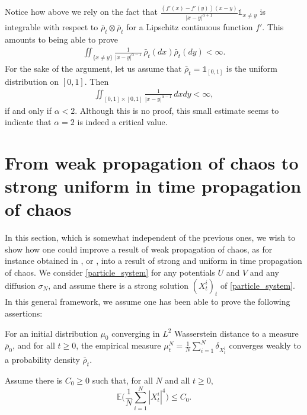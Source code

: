 \begin{remark}
Notice how above we rely on the fact that $\frac{(f'(x)-f'(y))(x-y)}{|x-y|^{\alpha+1}}\mathds{1}_{x\neq y}$ is integrable with respect to $\bar{\rho}_t\otimes\bar{\rho}_t$ for a Lipschitz continuous function $f'$. This amounts to being able to prove
\begin{align*}
\iint_{\{x\neq y\}}\frac{1}{|x-y|^{\alpha-1}}\,\bar{\rho}_t(dx)\bar{\rho}_t(dy)<\infty.
\end{align*}
For the sake of the argument, let us assume that $\bar{\rho}_t=\mathds{1}_{[0,1]}$ is the uniform distribution on $[0,1]$. Then
\begin{align*}
\iint_{[0,1]\times[0,1]}\frac{1}{|x-y|^{\alpha-1}}\,dxdy<\infty,
\end{align*}
if and only if $\alpha<2$. Although this is no proof, this small estimate seems to indicate that $\alpha=2$ is indeed a critical value.
\end{remark}

\section{From weak propagation of chaos to strong uniform in time propagation of chaos}\label{sec_from_weak_to_strong}

In this section, which is somewhat independent of the previous ones, we wish to show how one could improve a result of weak propagation of chaos, as for instance obtained in \cite{Rogers_Shi}, \cite{cepa_lepingle} or \cite{Li_Li_Xie}, into a result of strong and uniform in time propagation of chaos. We consider \eqref{particle_system} for any potentials $U$ and $V$ and any diffusion $\sigma_N$, and assume there is a strong solution $(X^i_t)_t$ of \eqref{particle_system}. In this general framework, we assume one has been able to prove the following assertions:

\begin{assumption}\label{Hyp_weak_prop}
For an initial distribution $\mu_0$ converging in $L^2$ Wasserstein distance to a measure $\bar{\rho}_0$, and for all $t\geq0$, the empirical measure ${\mu^N_t=\frac{1}{N}\sum_{i=1}^N\delta_{X^i_t}}$ converges weakly to a probability density $\bar{\rho}_t$.
\end{assumption}

\begin{assumption}\label{Hyp_bounded_moments}
Assume there is $C_0\geq0$ such that, for all $N$ and all $t\geq0$,
\[
\mathbb{E}\biggl(\frac{1}{N}\sum_{i=1}^N|X^i_t|^{4}\biggr)\leq C_0.
\]
\end{assumption}

